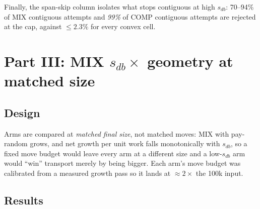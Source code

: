 \documentclass[11pt]{article}
\begin{document}
Finally, the span-skip column isolates what stops contiguous at high $s_{db}$:
70--94\% of MIX contiguous attempts and \emph{99\%} of COMP contiguous
attempts are rejected at the cap, against $\le2.3\%$ for every convex cell.

\section{Part III: MIX $s_{db}\times$ geometry at matched size}

\subsection{Design}

Arms are compared at \emph{matched final size}, not matched moves: MIX with
pay-random grows, and net growth per unit work falls monotonically with
$s_{db}$, so a fixed move budget would leave every arm at a different size and
a low-$s_{db}$ arm would ``win'' transport merely by being bigger. Each arm's
move budget was calibrated from a measured growth pass so it lands at
$\approx2\times$ the 100k input.

\subsection{Results}
\end{document}
